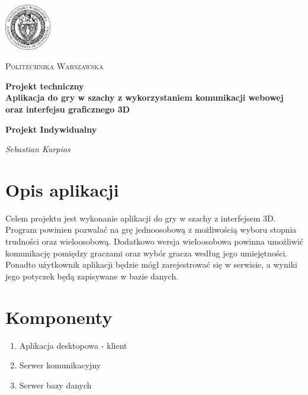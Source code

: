 \documentclass[12pt]{article}
\begin{document}
\begin{titlepage}
\centering
\includegraphics[width=0.15\textwidth]{logo}\par\vspace{1cm}
{\scshape\LARGE Politechnika Warszawska \par}
\vspace{1cm}
{\huge\bfseries  Projekt techniczny \linebreak \\ Aplikacja do gry w szachy z wykorzystaniem komunikacji webowej oraz interfejsu graficznego 3D \par}
\vspace{1cm}
{\bfseries Projekt Indywidualny \par}
\vspace{2cm}
{\Large\itshape  Sebastian Kurpios \par}
\end{titlepage}

\tableofcontents
\newpage

\section{Opis aplikacji}
Celem projektu jest wykonanie aplikacji do gry w szachy z interfejsem 3D. Program powinien pozwalać na grę jednoosobową z możliwością wyboru stopnia trudności oraz wieloosobową. Dodatkowo wersja wieloosobowa powinna umożliwić komunikację pomiędzy graczami oraz wybór gracza według jego umiejętności. Ponadto użytkownik aplikacji będzie mógł zarejestrować się w serwisie, a wyniki jego potyczek będą zapisywane w bazie danych.  

\section{Komponenty}
\begin{enumerate}
\item Aplikacja desktopowa - klient
\item Serwer komunikacyjny
\item Serwer bazy danych
\end{enumerate}
\end{document}
